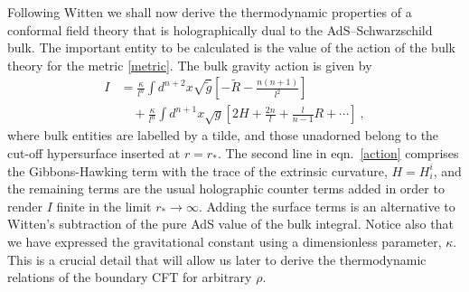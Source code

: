 \documentclass[a4paper,12pt]{article}
\begin{document}
Following Witten \cite{Witten98-2} we shall now derive the
thermodynamic properties of a conformal field theory that is
holographically dual to the AdS--Schwarzschild bulk. The important
entity to be calculated is the value of the action of the bulk theory
for the metric \eqref{metric}. The bulk gravity action is given by
\begin{equation}
\label{action}
\begin{split}
  I &= \frac{\kappa}{l^n} \int d^{n+2}x \sqrt{\tilde{g}} \left[
  -\tilde{R} - \frac{n(n+1)}{l^2} \right] \\
   &\quad + \frac{\kappa}{l^n} \int d^{n+1} x \sqrt{g} \left[ 2H
  +\frac{2n}{l} + \frac{l}{n-1} R + \cdots \right]~,
\end{split}
\end{equation}
where bulk entities are labelled by a tilde, and those unadorned
belong to the cut-off hypersurface inserted at $r=r_\ast$. The second
line in eqn.\ \eqref{action} comprises the Gibbons-Hawking term with
the trace of the extrinsic curvature, $H=H^i_i$, and the remaining terms are
the usual holographic counter terms added in order to render $I$ finite in
the limit $r_\ast\to \infty$. Adding the surface terms is an
alternative to Witten's subtraction of the pure AdS value of the bulk
integral.
Notice also that we have expressed the
gravitational constant using a dimensionless parameter, $\kappa$. This
is a crucial detail that will allow us later to derive the
thermodynamic relations of the boundary CFT for arbitrary $\rho$.
\end{document}
